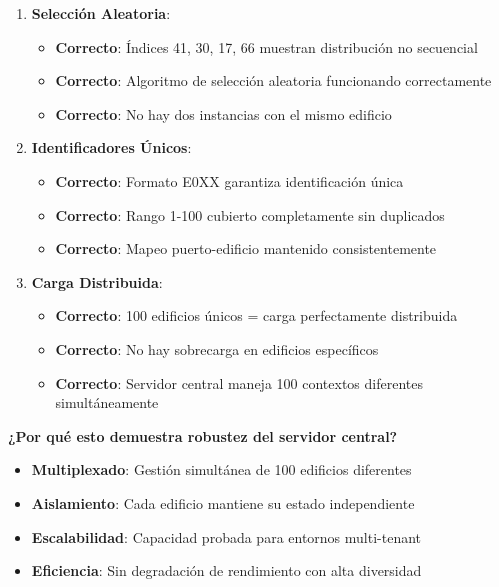 \begin{enumerate}
    \item \textbf{Selección Aleatoria}:
    \begin{itemize}
        \item \textcolor{successgreen}{\textbf{Correcto}}: Índices 41, 30, 17, 66 muestran distribución no secuencial
        \item \textcolor{successgreen}{\textbf{Correcto}}: Algoritmo de selección aleatoria funcionando correctamente
        \item \textcolor{successgreen}{\textbf{Correcto}}: No hay dos instancias con el mismo edificio
    \end{itemize}
    
    \item \textbf{Identificadores Únicos}:
    \begin{itemize}
        \item \textcolor{successgreen}{\textbf{Correcto}}: Formato E0XX garantiza identificación única
        \item \textcolor{successgreen}{\textbf{Correcto}}: Rango 1-100 cubierto completamente sin duplicados
        \item \textcolor{successgreen}{\textbf{Correcto}}: Mapeo puerto-edificio mantenido consistentemente
    \end{itemize}
    
    \item \textbf{Carga Distribuida}:
    \begin{itemize}
        \item \textcolor{successgreen}{\textbf{Correcto}}: 100 edificios únicos = carga perfectamente distribuida
        \item \textcolor{successgreen}{\textbf{Correcto}}: No hay sobrecarga en edificios específicos
        \item \textcolor{successgreen}{\textbf{Correcto}}: Servidor central maneja 100 contextos diferentes simultáneamente
    \end{itemize}
\end{enumerate}

\textbf{¿Por qué esto demuestra robustez del servidor central?}
\begin{itemize}
    \item \textbf{Multiplexado}: Gestión simultánea de 100 edificios diferentes
    \item \textbf{Aislamiento}: Cada edificio mantiene su estado independiente
    \item \textbf{Escalabilidad}: Capacidad probada para entornos multi-tenant
    \item \textbf{Eficiencia}: Sin degradación de rendimiento con alta diversidad
\end{itemize}

